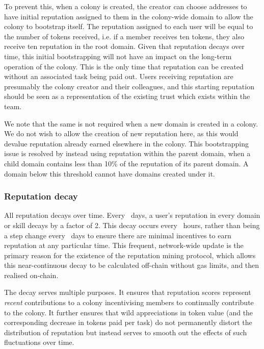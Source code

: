To prevent this, when a colony is created, the creator can choose addresses to have initial reputation assigned to them in the colony-wide domain to allow the colony to bootstrap itself. The reputation assigned to each user will be equal to the number of tokens received, i.e. if a member receives ten tokens, they also receive ten reputation in the root domain. Given that reputation decays over time, this initial bootstrapping will not have an impact on the long-term operation of the colony. This is the only time that reputation can be created without an associated task being paid out. Users receiving reputation are presumably the colony creator and their colleagues, and this starting reputation should be seen as a representation of the existing trust which exists within the team.

We note that the same is not required when a new domain is created in a colony. We do not wish to allow the creation of new reputation here, as this would devalue reputation already earned elsewhere in the colony. This bootstrapping issue is resolved by instead using reputation within the parent domain, when a child domain contains less than 10\% of the reputation of its parent domain. A domain below this threshold cannot have domains created under it.

\subsubsection*{Reputation decay}

All reputation decays over time. Every \repdecayduration\ days, a user's reputation in every domain or skill decays by a factor of 2. This decay occurs every \miningcycleduration\ hours, rather than being a step change every \repdecayduration\ days to ensure there are minimal incentives to earn reputation at any particular time. This frequent, network-wide update is the primary reason for the existence of the reputation mining protocol, which allows this near-continuous decay to be calculated off-chain without gas limits, and then realised on-chain.

The decay serves multiple purposes. It ensures that reputation scores represent \emph{recent} contributions to a colony incentivising members to continually contribute to the colony. It further ensures that wild appreciations in token value (and the corresponding decrease in tokens paid per task) do not permanently distort the distribution of reputation but instead serves to smooth out the effects of such fluctuations over time.

